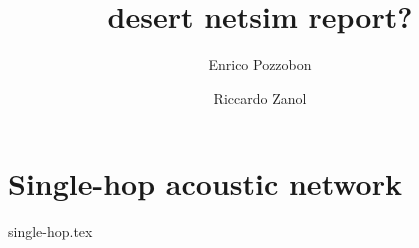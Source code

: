 \documentclass[a4paper,twoside,twocolumn]{article}
\author{Enrico Pozzobon \and Riccardo Zanol}
\title{desert netsim report?}
\begin{document}
\maketitle

\section{Single-hop acoustic network}
{single-hop.tex}

\printbibliography
\end{document}
